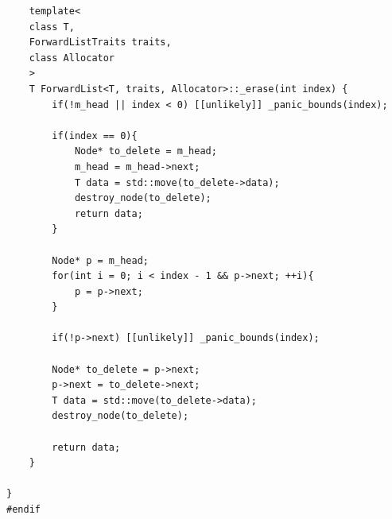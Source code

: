 \documentclass[supercite]{Experimental_Report}
\theoremstyle{definition}
\begin{document}
\begin{lstlisting}
	template<
	class T,
	ForwardListTraits traits,
	class Allocator
	>
	T ForwardList<T, traits, Allocator>::_erase(int index) {
		if(!m_head || index < 0) [[unlikely]] _panic_bounds(index);
		
		if(index == 0){
			Node* to_delete = m_head;
			m_head = m_head->next;
			T data = std::move(to_delete->data);
			destroy_node(to_delete);
			return data;
		}
		
		Node* p = m_head;
		for(int i = 0; i < index - 1 && p->next; ++i){
			p = p->next;
		}
		
		if(!p->next) [[unlikely]] _panic_bounds(index);
		
		Node* to_delete = p->next;
		p->next = to_delete->next;
		T data = std::move(to_delete->data);
		destroy_node(to_delete);
		
		return data;
	}
	
}
#endif
\end{lstlisting}
\end{document}

